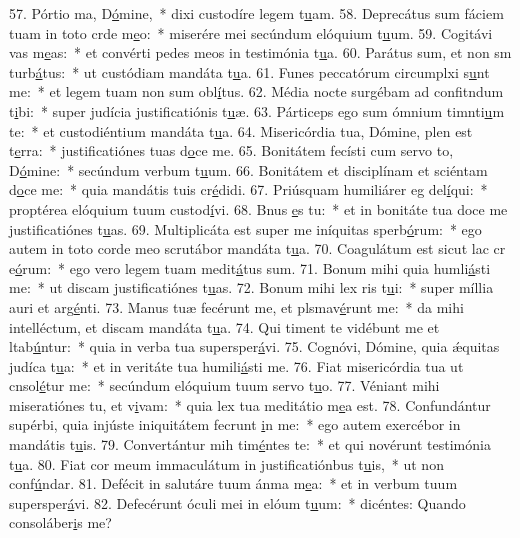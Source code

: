 57. Pórtio ma, D\uline{ó}mine,~* dixi custodíre legem t\uline{u}am.
58. Deprecátus sum fáciem tuam in toto crde m\uline{e}o:~* miserére mei secúndum elóquium t\uline{u}um.
59. Cogitávi vas m\uline{e}as:~* et convérti pedes meos in testimónia t\uline{u}a.
60. Parátus sum, et non sm turb\uline{á}tus:~* ut custódiam mandáta t\uline{u}a.
61. Funes peccatórum circumplxi s\uline{u}nt me:~* et legem tuam non sum obl\uline{í}tus.
62. Média nocte surgébam ad confitndum t\uline{i}bi:~* super judícia justificatiónis t\uline{u}æ.
63. Párticeps ego sum ómnium timnti\uline{u}m te:~* et custodiéntium mandáta t\uline{u}a.
64. Misericórdia tua, Dómine, plen est t\uline{e}rra:~* justificatiónes tuas d\uline{o}ce me.
65. Bonitátem fecísti cum servo to, D\uline{ó}mine:~* secúndum verbum t\uline{u}um.
66. Bonitátem et disciplínam et sciéntam d\uline{o}ce me:~* quia mandátis tuis cr\uline{é}didi.
67. Priúsquam humiliárer eg del\uline{í}qui:~* proptérea elóquium tuum custod\uline{í}vi.
68. Bnus \uline{e}s tu:~* et in bonitáte tua doce me justificatiónes t\uline{u}as.
69. Multiplicáta est super me iníquitas sperb\uline{ó}rum:~* ego autem in toto corde meo scrutábor mandáta t\uline{u}a.
70. Coagulátum est sicut lac cr e\uline{ó}rum:~* ego vero legem tuam medit\uline{á}tus sum.
71. Bonum mihi quia humli\uline{á}sti me:~* ut discam justificatiónes t\uline{u}as.
72. Bonum mihi lex ris t\uline{u}i:~* super míllia auri et arg\uline{é}nti.
73. Manus tuæ fecérunt me, et plsmav\uline{é}runt me:~* da mihi intelléctum, et discam mandáta t\uline{u}a.
74. Qui timent te vidébunt me et ltab\uline{ú}ntur:~* quia in verba tua supersper\uline{á}vi.
75. Cognóvi, Dómine, quia ǽquitas judíca t\uline{u}a:~* et in veritáte tua humili\uline{á}sti me.
76. Fiat misericórdia tua ut cnsol\uline{é}tur me:~* secúndum elóquium tuum servo t\uline{u}o.
77. Véniant mihi miseratiónes tu, et v\uline{i}vam:~* quia lex tua meditátio m\uline{e}a est.
78. Confundántur supérbi, quia injúste iniquitátem fecrunt \uline{i}n me:~* ego autem exercébor in mandátis t\uline{u}is.
79. Convertántur mih tim\uline{é}ntes te:~* et qui novérunt testimónia t\uline{u}a.
80. Fiat cor meum immaculátum in justificatiónbus t\uline{u}is,~* ut non conf\uline{ú}ndar.
81. Defécit in salutáre tuum ánma m\uline{e}a:~* et in verbum tuum supersper\uline{á}vi.
82. Defecérunt óculi mei in elóum t\uline{u}um:~* dicéntes: Quando consoláber\uline{i}s me?
